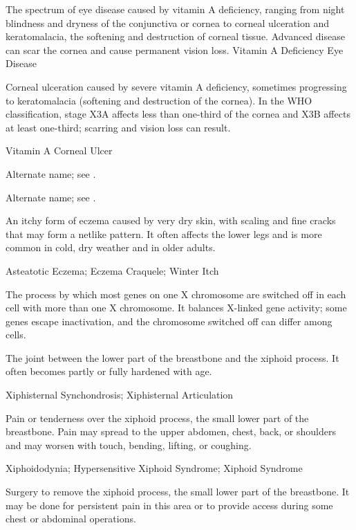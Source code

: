  The spectrum of eye disease caused by vitamin A deficiency, ranging
from night blindness and dryness of the conjunctiva or cornea to corneal ulceration and
keratomalacia, the softening and destruction of corneal tissue. Advanced disease can scar
the cornea and cause permanent vision loss.
\synonyms
Vitamin A Deficiency Eye Disease

 Corneal ulceration caused by severe vitamin A deficiency, sometimes progressing to keratomalacia (softening and destruction of the cornea). In the WHO classification, stage X3A affects less than one-third of the cornea and X3B affects at least one-third; scarring and vision loss can result.

\synonyms
Vitamin A Corneal Ulcer

 Alternate name; see .

 Alternate name; see .

 An itchy form of eczema caused by very dry skin, with scaling and fine cracks that may form a netlike pattern. It often affects the lower legs and is more common in cold, dry weather and in older adults.

\synonyms
Asteatotic Eczema; Eczema Craquele; Winter Itch

 The process by which most genes on one X chromosome are switched off in each cell with more than one X chromosome. It balances X-linked gene activity; some genes escape inactivation, and the chromosome switched off can differ among cells.

 The joint between the lower part of the breastbone and the xiphoid process. It often becomes partly or fully hardened with age.

\synonyms
Xiphisternal Synchondrosis; Xiphisternal Articulation

 Pain or tenderness over the xiphoid process, the small lower part of the breastbone. Pain may spread to the upper abdomen, chest, back, or shoulders and may worsen with touch, bending, lifting, or coughing.

\synonyms
Xiphoidodynia; Hypersensitive Xiphoid Syndrome; Xiphoid Syndrome

 Surgery to remove the xiphoid process, the small lower part of the breastbone. It may be done for persistent pain in this area or to provide access during some chest or abdominal operations.

